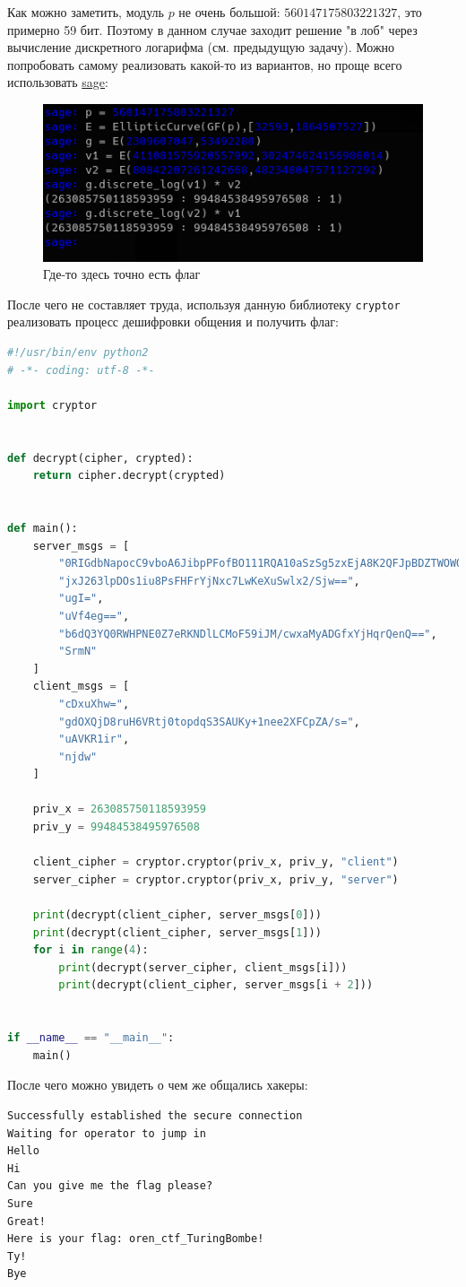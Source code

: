 \documentclass[idxtotoc,hyperref,openany,oneside]{files/crypto} %
\begin{document}
Как можно заметить, модуль $p$ не очень большой: $560147175803221327$, это примерно 59 бит. Поэтому в данном случае заходит решение "в лоб"{} через вычисление дискретного логарифма (см. предыдущую задачу). Можно попробовать самому реализовать какой-то из вариантов, но проще всего использовать \href{https://www.sagemath.org/}{sage}:
\begin{figure}[H]
\begin{center}
\includegraphics[width=1.0\linewidth]{files/sage}
\end{center}
\caption{Где-то здесь точно есть флаг}
\label{fig:chinese}
\end{figure}

После чего не составляет труда, используя данную библиотеку \verb|cryptor| реализовать процесс дешифровки общения и получить флаг:
\begin{lstlisting}[language=Python, caption=Секреты перестают быть таковыми]
#!/usr/bin/env python2
# -*- coding: utf-8 -*-

import cryptor


def decrypt(cipher, crypted):
    return cipher.decrypt(crypted)


def main():
    server_msgs = [
        "0RIGdbNapocC9vboA6JibpPFofBO111RQA10aSzSg5zxEjA8K2QFJpBDZTWOWQ==",
        "jxJ263lpDOs1iu8PsFHFrYjNxc7LwKeXuSwlx2/Sjw==",
        "ugI=",
        "uVf4eg==",
        "b6dQ3YQ0RWHPNE0Z7eRKNDlLCMoF59iJM/cwxaMyADGfxYjHqrQenQ==",
        "SrmN"
    ]
    client_msgs = [
        "cDxuXhw=",
        "gdOXQjD8ruH6VRtj0topdqS3SAUKy+1nee2XFCpZA/s=",
        "uAVKR1ir",
        "njdw"
    ]

    priv_x = 263085750118593959
    priv_y = 99484538495976508

    client_cipher = cryptor.cryptor(priv_x, priv_y, "client")
    server_cipher = cryptor.cryptor(priv_x, priv_y, "server")

    print(decrypt(client_cipher, server_msgs[0]))
    print(decrypt(client_cipher, server_msgs[1]))
    for i in range(4):
        print(decrypt(server_cipher, client_msgs[i]))
        print(decrypt(client_cipher, server_msgs[i + 2]))


if __name__ == "__main__":
    main()
\end{lstlisting}

После чего можно увидеть о чем же общались хакеры:
\begin{verbatim}
Successfully established the secure connection
Waiting for operator to jump in
Hello
Hi
Can you give me the flag please?
Sure
Great!
Here is your flag: oren_ctf_TuringBombe!
Ty!
Bye
\end{verbatim}

\end{document}
